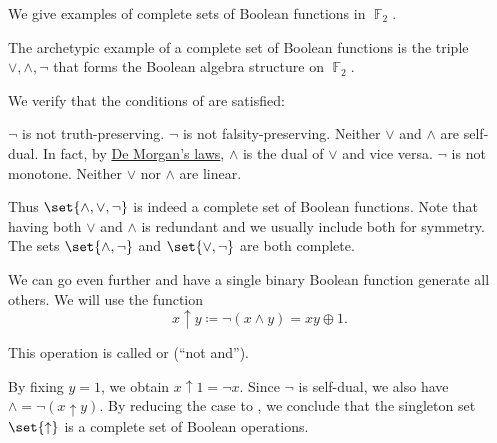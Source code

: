 \begin{example}\label{ex:posts_completeness_theorem}
  We give examples of complete sets of Boolean functions in \( \BbbF_2 \).

  \begin{thmenum}
     The archetypic example of a complete set of Boolean functions is the triple \( \vee, \wedge, \neg \) that forms the Boolean algebra structure on \( \BbbF_2 \).

    We verify that the conditions of  are satisfied:
    \begin{reflist}
       \( \neg \) is not truth-preserving.
       \( \neg \) is not falsity-preserving.
       Neither \( \vee \) and \( \wedge \) are self-dual. In fact, by \hyperref[thm:de_morgans_laws]{De Morgan's laws}, \( \wedge \) is the dual of \( \vee \) and vice versa.
       \( \neg \) is not monotone.
       Neither \( \vee \) nor \( \wedge \) are linear.
    \end{reflist}

    Thus \( \set{ \wedge, \vee, \neg } \) is indeed a complete set of Boolean functions. Note that having both \( \vee \) and \( \wedge \) is redundant and we usually include both for symmetry. The sets \( \set{ \wedge, \neg } \) and \( \set{ \vee, \neg } \) are both complete.

     We can go even further and have a single binary Boolean function generate all others. We will use the function
    \begin{equation}\label{eq:ex:posts_completeness_theorem/nand}
      x \uparrow y \coloneqq \neg(x \wedge y) = xy \oplus 1.
    \end{equation}

    This operation is called  or  (\enquote{not and}).

    By fixing \( y = 1 \), we obtain \( x \uparrow 1 = \neg x \). Since \( \neg \) is self-dual, we also have \( \wedge = \neg(x \uparrow y) \). By reducing the case to , we conclude that the singleton set \( \set{ \uparrow } \) is a complete set of Boolean operations.


\end{thmenum}
\end{example}
